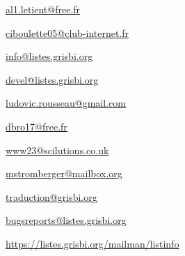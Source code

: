 \urldef{\urlAlainLetientEmail}%
\url{al1.letient@free.fr}     %


\urldef{\urlMicheleBondilEmail}%
\url{ciboulette05@club-internet.fr}     %

\urldef{\urlListInfoEmail}%
\url{info@listes.grisbi.org}     %

\urldef{\urlListDevelEmail}%
\url{devel@listes.grisbi.org}     %

\urldef{\urlLudovicRousseauEmail}%
\url{ludovic.rousseau@gmail.com}     %

\urldef{\urlDominiqueBrochardEmail}%
\url{dbro17@free.fr}     %

\urldef{\urlBobAndersonEmail}%
\url{www23@scilutions.co.uk}     %

\urldef{\urlMartinStrombergerEmail}%
\url{mstromberger@mailbox.org}     %

\urldef{\urlListTraductionEmail}%
\url{traduction@grisbi.org}  %

\urldef{\urlListBugsreport}%
\url{bugsreports@listes.grisbi.org}     %

\urldef{\urlListDiffGrisbi}%
\url{https://listes.grisbi.org/mailman/listinfo}     %


